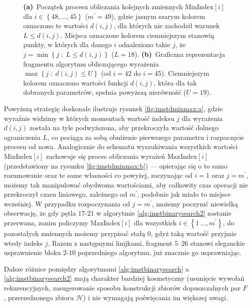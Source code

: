 \begin{figure}[!htbp]
{		\textbf{(a)}~Początek procesu obliczania kolejnych zmiennych $\text{MinIndex} \left[ i \right]$ dla $i \in \left\{ 48, \dots, 45 \right\}$ ($m^{\prime} = 49$), gdzie jasnym szarym kolorem oznaczono te wartości $d \left( i, j \right)$, dla których nie zachodził warunek $L \leqslant d \left( i, j \right)$. Miejsca oznaczone kolorem ciemniejszym stanowią punkty, w których dla danego $i$ odnaleziono takie $j$, że $j = \min \left\{ j \; : \; L \leqslant d \left( i, j \right) \right\}$ ($L = 18$).
		\textbf{(b)}~Graficzna reprezentacja fragmentu algorytmu obliczającego wyrażenia $\max \left\{ j \; : \; d \left( i, j \right) \leqslant U \right\}$ (od $i = 42$ do $i = 45$). Ciemniejszym kolorem oznaczono wartości funkcji $d \left( i, j \right)$, która dla tak dobranych parametrów, spełnia powyższą nierówność ($U = 19$).
	}
	\label{fig:imstdminmax}
\end{figure}

 Powyższą strategię doskonale ilustruje rysunek \ref{fig:imstdminmax:a}, gdzie wyraźnie widzimy w których momentach wartość indeksu $j$ dla wyrażenia $d \left( i, j \right)$ została na tyle podwyższona, aby przekroczyła wartość dolnego ograniczenia $L$, co pociąga za sobą obniżenie pierwszego parametru i rozpoczęcie procesu od nowa. Analogicznie do schematu wyszukiwania wszystkich wartości $\text{MinIndex} \left[ i \right]$ zachowuje się proces obliczania wyrażeń $\text{MaxIndex} \left[ i \right]$ (przedstawiony na rysunku \ref{fig:imstdminmax:b}) --- opierając się o to samo rozumowanie oraz te same własności co powyżej, zaczynając od $i = 1$ oraz $j = m^{\prime}$, możemy tak manipulować obydwoma wartościami, aby całkowity czas operacji nie przekroczył czasu liniowego, zależnego od $m^{\prime}$, podobnie jak miało to miejsce wcześniej. W przypadku rozpoczynania od $j = m^{\prime}$, możemy poczynić niewielką obserwację, że gdy pętla $17$-$21$ w algorytmie \ref{alg:imstbinarysearch2} zostanie przerwana, zanim policzymy $\text{MaxIndex} \left[ i \right]$ dla wszystkich $i \in \left\{ 1\, \dots, m^{\prime} \right\}$, do pozostałych zmiennych możemy przypisać stałą $0$, gdyż taką wartość przyjmie wtedy indeks $j$. Razem z następnymi linijkami, fragment $5$--$26$ stanowi eleganckie usprawnienie bloku $2$-$10$ poprzedniego algorytmu, już znacznie go usprawniając.

Dalsze różnice pomiędzy algorytmami \ref{alg:imstbinarysearch} a \ref{alg:imstbinarysearch2} mają charakter bardziej kosmetyczny (usunięcie wywołań rekurencyjnych, zasugerowanie sposobu konstrukcji zbiorów dopuszczalnych par $F$, przerzedzonego zbioru $\mathcal{H}$) i nie wymagają poświęcania im większej uwagi.

